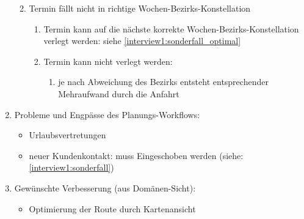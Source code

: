 \documentclass[Bachelorarbeit.tex]{subfiles}
\begin{document}
\begin{enumerate}
\begin{enumerate}
\begin{enumerate}
		\end{enumerate}
		\item Termin fällt nicht in richtige Wochen-Bezirks-Konstellation
		\begin{enumerate}
			\item Termin kann auf die nächste korrekte Wochen-Bezirks-Konstellation verlegt werden:
			siehe \ref{interview1:sonderfall_optimal}
			\item Termin kann nicht verlegt werden:
			\begin{enumerate}
				\item[] je nach Abweichung des Bezirks entsteht entsprechender Mehraufwand durch die Anfahrt
			\end{enumerate}
		\end{enumerate}
	\end{enumerate}
	\item Probleme und Engpässe des Planungs-Workflows:
	\begin{itemize}
		\item Urlaubsvertretungen
		\item neuer Kundenkontakt: muss Eingeschoben werden (siehe: \ref{interview1:sonderfall})
	\end{itemize}
	\item Gewünschte Verbesserung (aus Domänen-Sicht):
	\begin{itemize}
		\item[] Optimierung der Route durch Kartenansicht
	\end{itemize}
\end{enumerate}
\newpage
\end{document}
